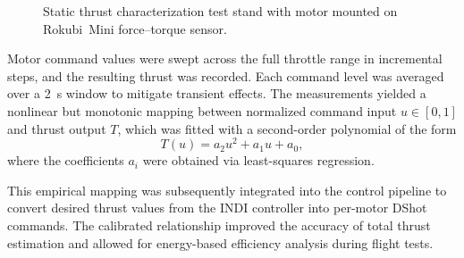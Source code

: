 \begin{figure}[h]
\caption{Static thrust characterization test stand with motor mounted on Rokubi~Mini force–torque sensor.}
\label{fig:force_test_stand}
\end{figure}

Motor command values were swept across the full throttle range in incremental steps, and the resulting thrust was recorded.  
Each command level was averaged over a \SI{2}{\second} window to mitigate transient effects.  
The measurements yielded a nonlinear but monotonic mapping between normalized command input $u \in [0,1]$ and thrust output $T$, which was fitted with a second-order polynomial of the form
\begin{equation}
T(u) = a_2 u^2 + a_1 u + a_0,
\end{equation}
where the coefficients $a_i$ were obtained via least-squares regression.

This empirical mapping was subsequently integrated into the control pipeline to convert desired thrust values from the INDI controller into per-motor DShot commands.  
The calibrated relationship improved the accuracy of total thrust estimation and allowed for energy-based efficiency analysis during flight tests.

